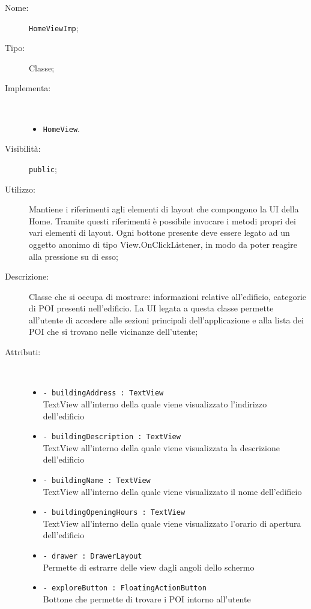 \documentclass[../DefinizioneDiProdotto.tex]{subfiles}
\begin{document}
    \begin{description}
\item[Nome:] \texttt{HomeViewImp};
\item[Tipo:] Classe;
\item[Implementa:] \
\begin{itemize}
\item \texttt{HomeView}.

\end{itemize}
\item[Visibilità:] \texttt{public};
\item[Utilizzo:] Mantiene i riferimenti agli elementi di layout che compongono la UI della Home. Tramite questi riferimenti è possibile invocare i metodi propri dei vari elementi di layout. 
Ogni bottone presente deve essere legato ad un oggetto anonimo di tipo View.OnClickListener, in modo da poter reagire alla pressione su di esso;
\item[Descrizione:] Classe che si occupa di mostrare: informazioni relative all'edificio, categorie di POI presenti nell'edificio. La UI legata a questa classe permette all'utente di accedere alle sezioni principali dell'applicazione e alla lista dei POI che si trovano nelle vicinanze dell'utente;
\item[Attributi:] \
\begin{itemize}
\item \texttt{- buildingAddress : TextView}\\
TextView all'interno della quale viene visualizzato l'indirizzo dell'edificio

\item \texttt{- buildingDescription : TextView}\\
TextView all'interno della quale viene visualizzata la descrizione dell'edificio

\item \texttt{- buildingName : TextView}\\
TextView all'interno della quale viene visualizzato il nome dell'edificio

\item \texttt{- buildingOpeningHours : TextView}\\
TextView all'interno della quale viene visualizzato l'orario di apertura dell'edificio

\item \texttt{- drawer : DrawerLayout}\\
Permette di estrarre delle view dagli angoli dello schermo

\item \texttt{- exploreButton : FloatingActionButton}\\
Bottone che permette di trovare i POI intorno all'utente


\end{itemize}
\end{description}
\end{document}
